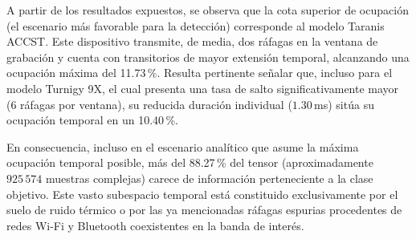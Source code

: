 \begin{table}[htbp]
\centering
\small
\caption{Ciclo de trabajo empírico y ocupación temporal máxima por modelo en una ventana de observación de 75\,ms.}
\label{tab:ocupacion_temporal}
\end{table}

A partir de los resultados expuestos, se observa que la cota superior de ocupación (el escenario más favorable para la detección) corresponde al modelo Taranis ACCST. Este dispositivo transmite, de media, dos ráfagas en la ventana de grabación y cuenta con transitorios de mayor extensión temporal, alcanzando una ocupación máxima del 11.73\,\%. Resulta pertinente señalar que, incluso para el modelo Turnigy 9X, el cual presenta una tasa de salto significativamente mayor (6 ráfagas por ventana), su reducida duración individual ($1.30$\,ms) sitúa su ocupación temporal en un 10.40\,\%.

En consecuencia, incluso en el escenario analítico que asume la máxima ocupación temporal posible, más del 88.27\,\% del tensor (aproximadamente $925\,574$ muestras complejas) carece de información perteneciente a la clase objetivo. Este vasto subespacio temporal está constituido exclusivamente por el suelo de ruido térmico o por las ya mencionadas ráfagas espurias procedentes de redes Wi-Fi y Bluetooth coexistentes en la banda de interés.


